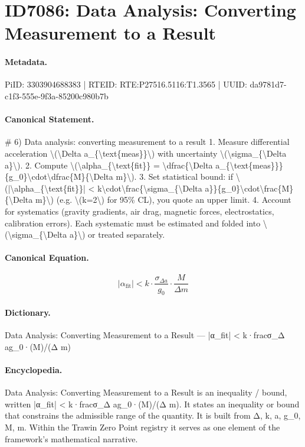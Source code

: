 \section*{ID7086: Data Analysis: Converting Measurement to a Result}
\paragraph{Metadata.}
PiID: 3303904688383 | RTEID: RTE:P27516.5116:T1.3565 | UUID: da9781d7-c1f3-555e-9f3a-85200c980b7b

\paragraph{Canonical Statement.}
\# 6) Data analysis: converting measurement to a result 1. Measure differential acceleration \textbackslash{}(\textbackslash{}Delta a\_\{\textbackslash{}text\{meas\}\}\textbackslash{}) with uncertainty \textbackslash{}(\textbackslash{}sigma\_\{\textbackslash{}Delta a\}\textbackslash{}). 2. Compute \textbackslash{}(\textbackslash{}alpha\_\{\textbackslash{}text\{fit\}\} = \textbackslash{}dfrac\{\textbackslash{}Delta a\_\{\textbackslash{}text\{meas\}\}\}\{g\_0\}\textbackslash{}cdot\textbackslash{}dfrac\{M\}\{\textbackslash{}Delta m\}\textbackslash{}). 3. Set statistical bound: if \textbackslash{}(|\textbackslash{}alpha\_\{\textbackslash{}text\{fit\}\}| < k\textbackslash{}cdot\textbackslash{}frac\{\textbackslash{}sigma\_\{\textbackslash{}Delta a\}\}\{g\_0\}\textbackslash{}cdot\textbackslash{}frac\{M\}\{\textbackslash{}Delta m\}\textbackslash{}) (e.g. \textbackslash{}(k=2\textbackslash{}) for 95\% CL), you quote an upper limit. 4. Account for systematics (gravity gradients, air drag, magnetic forces, electrostatics, calibration errors). Each systematic must be estimated and folded into \textbackslash{}(\textbackslash{}sigma\_\{\textbackslash{}Delta a\}\textbackslash{}) or treated separately.

\paragraph{Canonical Equation.}
\[
|\alpha_{\text{fit}}| < k\cdot\frac{\sigma_{\Delta a}}{g_0}\cdot\frac{M}{\Delta m}
\]

\paragraph{Dictionary.}
Data Analysis: Converting Measurement to a Result — |α\_fit| < k·fracσ\_Δ ag\_0·(M)/(Δ m)

\paragraph{Encyclopedia.}
Data Analysis: Converting Measurement to a Result is an inequality / bound, written |α\_fit| < k·fracσ\_Δ ag\_0·(M)/(Δ m). It states an inequality or bound that constrains the admissible range of the quantity. It is built from Δ, k, a, g\_0, M, m. Within the Trawin Zero Point registry it serves as one element of the framework's mathematical narrative.

